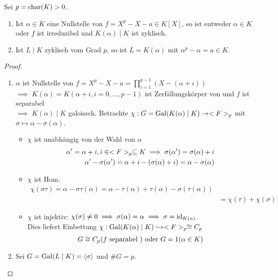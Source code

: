 \begin{proposition}
	Sei $p = \operatorname{char}(K) > 0$.
	\begin{enumerate}
		\item Ist $\alpha \in \overline{K}$ eine Nullstelle von $f = X^p - X - a \in K[X]$, so ist entweder $\alpha \in K$ oder $f$ ist irreduzibel und $K(\alpha)\mid K$ ist zyklisch.
		\item Ist $L \mid K$ zyklisch vom Grad $p$, so ist $L = K(\alpha)$ mit $\alpha^p - \alpha = a \in K$.
	\end{enumerate}
\end{proposition}
\begin{proof}
	\begin{enumerate}
		\item $\alpha$ ist Nullstelle von $f = X^p - X - a = \prod_{i=1}^{p-1} (X-(\alpha + i))$\\
		$\implies$ $K(\alpha) = K(\alpha + i, i=0, \dots, p-1)$ ist Zerfällungskörper von und $f$ ist separabel\\
		$\implies$ $K(\alpha)\mid K$ galoissch. Betrachte $\chi: G = \operatorname{Gal}(K(\alpha)\mid K) \to <F>_p$ mit $\sigma \mapsto \alpha - \sigma(\alpha)$.
		\begin{itemize}
			\item $\chi$ ist unabhängig von der Wahl von $\alpha$
			\begin{align*}
				\alpha' = \alpha +i, i \in <F>_p \subseteq K \implies \sigma(\alpha') = \sigma(\alpha)+i\\
				\alpha' - \sigma(\alpha') =\alpha + i - (\sigma(\alpha)+i) = \alpha - \sigma(\alpha)
			\end{align*}
			\item $\chi$ ist Hom.
			\begin{align*}
				\chi(\sigma \tau) = \alpha - \sigma \tau(\alpha) = \alpha - \tau(\alpha) + \tau(\alpha) - \sigma(\tau(\alpha))\\
				&= \chi(\tau) + \chi(\sigma)
			\end{align*}
			\item $\chi$ ist injektiv: $\chi(\sigma) \neq 0 \implies \sigma(\alpha) = \alpha \implies \sigma=\operatorname{id}_{K(\alpha)}$.\\
			Dies liefert Einbettung $\chi: \operatorname{Gal}(K(\alpha)\mid K) \hookrightarrow <F>_p \cong C_p$
			\begin{align*}
				G \cong C_p (f \text{ separabel }) \text{ oder } G = 1 (\alpha \in K)
			\end{align*}
		\end{itemize}
	\item Sei $G = \operatorname{Gal}(L \mid K) = \langle \sigma \rangle$ und $\# G = p$.

\end{enumerate}
\end{proof}
